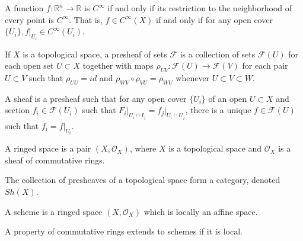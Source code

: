 \documentclass[crop=false,class=book,oneside]{standalone}
\begin{document}
A function $f:\mathbb{R}^n \rightarrow \mathbb{R}$ is $C^{\infty}$ if and only if its restriction to the neighborhood of every point is $C^{\infty}$. That is, $f\in C^{\infty}(X)$ if and only if for any open cover $\{U_i\},f\big|_{U_i}\in C^{\infty}(U_i)$.
\begin{definition}
If $X$ is a topological space, a presheaf of sets $\mathcal{F}$ is a collection of sets $\mathcal{F}(U)$ for each open set $U\subset X$ together with maps $\rho_{UV}:\mathcal{F}(U)\rightarrow \mathcal{F}(V)$ for each pair $U\subset V$ such that $\rho_{UU} = id$ and $\rho_{WV}\circ \rho_{VU} = \rho_{WU}$ whenever $U\subset V \subset W$.
\end{definition}
\begin{definition}
A sheaf is a presheaf such that for any open cover $\{U_i\}$ of an open $U\subset X$ and section $f_i \in \mathcal{F}(U_i)$ such that $F_i\big|_{U_i\cap I_j} = f_j\big|_{U_i\cap U_j}$, there is a unique $f\in \mathcal{F}(U)$ such that $f_i = f\big|_{U_i}$.
\end{definition}
\begin{definition}
A ringed space is a pair $(X,\mathcal{O}_X)$, where $X$ is a topological space and $\mathcal{O}_X$ is a sheaf of commutative rings.
\end{definition}
The collection of presheaves of a topological space form a category, denoted $Sh(X)$. 
\begin{definition}
A scheme is a ringed space $(X,\mathcal{O}_X)$ which is locally an affine space.
\end{definition}
\begin{theorem}
A property of commutative rings extends to schemes if it is local.
\end{theorem}
\end{document}
